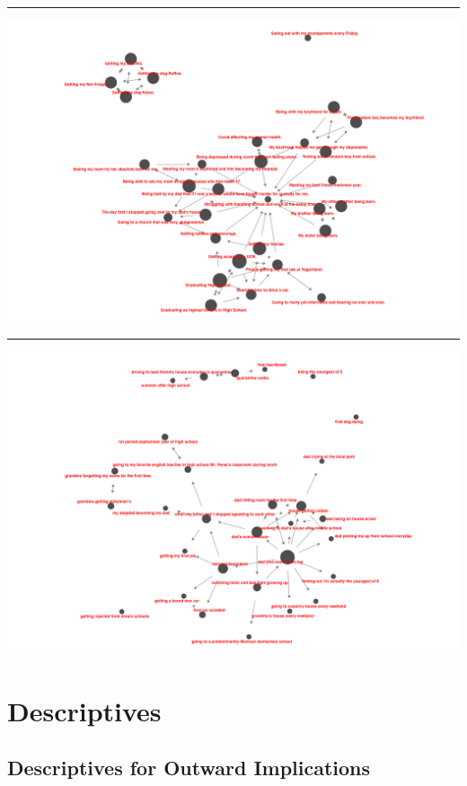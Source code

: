 \documentclass[
  .7em,
  letterpaper,
  DIV=11,
  numbers=noendperiod]{scrartcl}
\begin{document}
\begin{center}\rule{0.5\linewidth}{0.5pt}\end{center}

\includegraphics{images/61639_net.png}

\begin{center}\rule{0.5\linewidth}{0.5pt}\end{center}

\includegraphics{images/61605_net.png}

\hypertarget{descriptives}{%
\section{Descriptives}\label{descriptives}}

\hypertarget{descriptives-for-outward-implications}{%
\subsection{Descriptives for Outward
Implications}\label{descriptives-for-outward-implications}}
\end{document}
